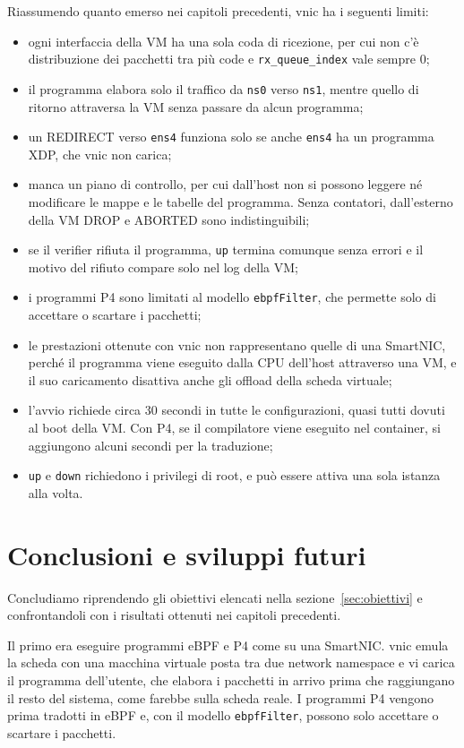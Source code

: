 Riassumendo quanto emerso nei capitoli precedenti, vnic ha i seguenti limiti:
\begin{itemize}
    \item ogni interfaccia della VM ha una sola coda di ricezione, per cui non c'è distribuzione dei pacchetti tra più code e \texttt{rx\_queue\_index} vale sempre 0;
    \item il programma elabora solo il traffico da \texttt{ns0} verso \texttt{ns1}, mentre quello di ritorno attraversa la VM senza passare da alcun programma;
    \item un REDIRECT verso \texttt{ens4} funziona solo se anche \texttt{ens4} ha un programma XDP, che vnic non carica;
    \item manca un piano di controllo, per cui dall'host non si possono leggere né modificare le mappe e le tabelle del programma. Senza contatori, dall'esterno della VM DROP e ABORTED sono indistinguibili;
    \item se il verifier rifiuta il programma, \texttt{up} termina comunque senza errori e il motivo del rifiuto compare solo nel log della VM;
    \item i programmi P4 sono limitati al modello \texttt{ebpfFilter}, che permette solo di accettare o scartare i pacchetti;
    \item le prestazioni ottenute con vnic non rappresentano quelle di una SmartNIC, perché il programma viene eseguito dalla CPU dell'host attraverso una VM, e il suo caricamento disattiva anche gli offload della scheda virtuale;
    \item l'avvio richiede circa 30 secondi in tutte le configurazioni, quasi tutti dovuti al boot della VM. Con P4, se il compilatore viene eseguito nel container, si aggiungono alcuni secondi per la traduzione;
    \item \texttt{up} e \texttt{down} richiedono i privilegi di root, e può essere attiva una sola istanza alla volta.
\end{itemize}

\section{Conclusioni e sviluppi futuri}\label{sec:conclusioni}

Concludiamo riprendendo gli obiettivi elencati nella sezione~\ref{sec:obiettivi} e confrontandoli con i risultati ottenuti nei capitoli precedenti.

Il primo era eseguire programmi eBPF e P4 come su una SmartNIC. vnic emula la scheda con una macchina virtuale posta tra due network namespace e vi carica il programma dell'utente, che elabora i pacchetti in arrivo prima che raggiungano il resto del sistema, come farebbe sulla scheda reale. I programmi P4 vengono prima tradotti in eBPF e, con il modello \texttt{ebpfFilter}, possono solo accettare o scartare i pacchetti.

